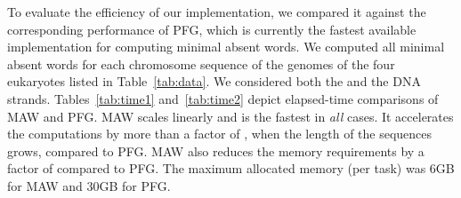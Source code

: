\documentclass{llncs}
\begin{document}
  To evaluate the efficiency of our implementation, we compared it 
against the corresponding performance of \textsf{PFG}, which is currently
the fastest available implementation for computing minimal absent words.
  We computed all minimal absent words for each chromosome sequence of 
the genomes of the four eukaryotes listed in Table~\ref{tab:data}.
  We considered both the  and the  
DNA strands.
  Tables~\ref{tab:time1} and~\ref{tab:time2} depict elapsed-time 
comparisons of \textsf{MAW} and \textsf{PFG}.
  \textsf{MAW} scales linearly and is the fastest in {\em all} cases.
  It accelerates the computations by more than a factor of , when 
the length of the sequences grows, compared to \textsf{PFG}.
  \textsf{MAW} also reduces the memory requirements by a factor of  compared to \textsf{PFG}.
  The maximum allocated memory (per task) was 6GB for \textsf{MAW} and 30GB for \textsf{PFG}.

\begin{table}[!ht]
\vspace{0.25cm}
\begin{center}
\qquad
{}
\end{center}
\caption{Elapsed-time comparison of \textsf{MAW} and \textsf{PFG} 
for computing all minimal absent words in the genome of 
{\em Arabidopsis thaliana} and {\em Drosophila melanogaster}}
\label{tab:time1}
\end{table}
\end{document}
